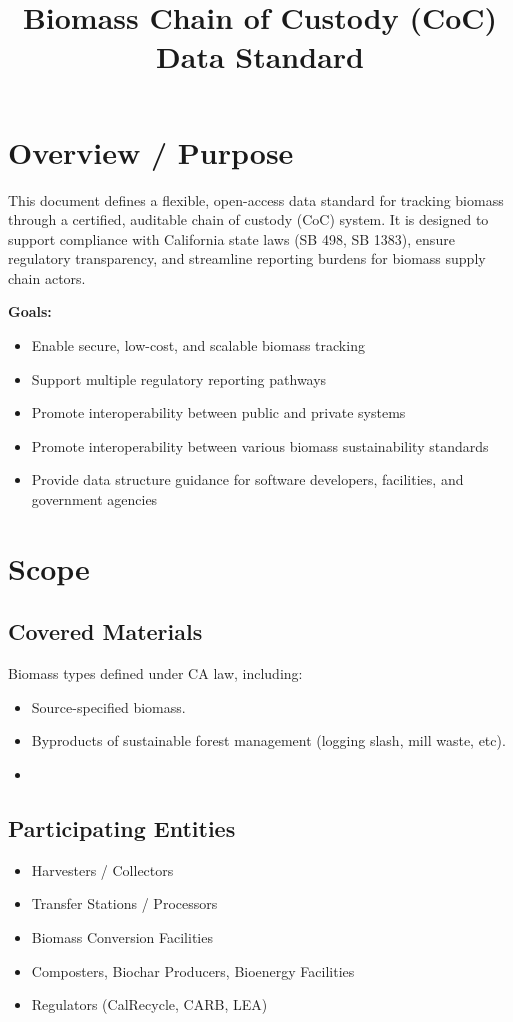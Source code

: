\documentclass{article}
\title{Biomass Chain of Custody (CoC) Data Standard}
\date{}
\begin{document}
\maketitle

\section{Overview / Purpose}
This document defines a flexible, open-access data standard for tracking biomass through a certified, auditable chain of custody (CoC) system. It is designed to support compliance with California state laws (SB 498, SB 1383), ensure regulatory transparency, and streamline reporting burdens for biomass supply chain actors.

\textbf{Goals:}
\begin{itemize}[noitemsep]
    \item Enable secure, low-cost, and scalable biomass tracking
    \item Support multiple regulatory reporting pathways
    \item Promote interoperability between public and private systems
    \item Promote interoperability between various biomass sustainability standards
    \item Provide data structure guidance for software developers, facilities, and government agencies
\end{itemize}

\section{Scope}
\subsection*{Covered Materials}
Biomass types defined under CA law, including:
\begin{itemize}[noitemsep]
    \item Source-specified biomass.
    \item Byproducts of sustainable forest management (logging slash, mill waste, etc).
    \item 
\end{itemize}

\subsection*{Participating Entities}
\begin{itemize}[noitemsep]
    \item Harvesters / Collectors
    \item Transfer Stations / Processors
    \item Biomass Conversion Facilities
    \item Composters, Biochar Producers, Bioenergy Facilities
    \item Regulators (CalRecycle, CARB, LEA)
\end{itemize}
\end{document}
